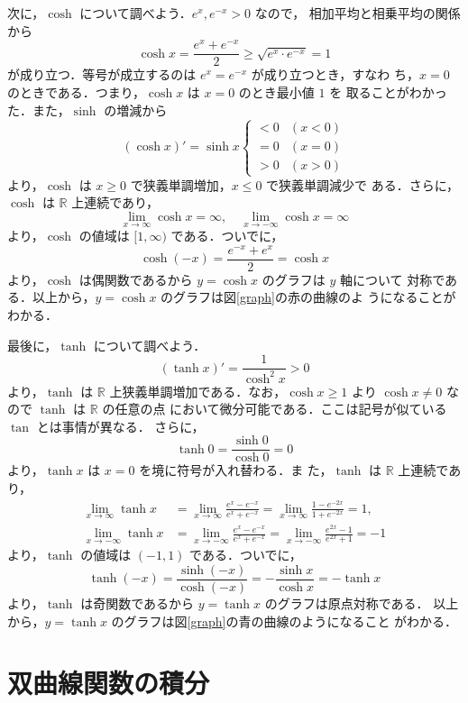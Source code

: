 \documentclass[dvipdfmx,12pt, uplatex]{jsarticle}
\begin{document}
次に，$\cosh$ について調べよう．$e^{x}, e^{-x}>0$ なので，
相加平均と相乗平均の関係から
\[
  \cosh x = \frac{e^{x} + e^{-x}}{2} \geq \sqrt{ e^{x} \cdot e^{-x}} = 1
\]
が成り立つ．等号が成立するのは $e^{x}=e^{-x}$ が成り立つとき，すなわ
ち，$x=0$ のときである．つまり，$\cosh x$ は $x=0$ のとき最小値 $1$ を
取ることがわかった．また，$\sinh$ の増減から
\[
  \left( \cosh x \right)' = \sinh x 
  \begin{cases}
    <0 & (x<0)\\
    =0 & (x=0)\\
    >0 & (x>0)
  \end{cases}
\]
より，$\cosh$ は $x \geq 0$ で狭義単調増加，$x \leq 0$ で狭義単調減少で
ある．さらに，$\cosh$ は $\mathbb{R}$ 上連続であり，
\[
\lim_{x \to \infty} \cosh x = \infty, \quad \lim_{x \to -\infty} \cosh x = \infty
\]
より，$\cosh$ の値域は $[1, \infty)$ である．ついでに，
\[
  \cosh (-x) = \frac{e^{-x} + e^{x}}{2} = \cosh x
\]
より，$\cosh$ は偶関数であるから $y=\cosh x$ のグラフは $y$ 軸について
対称である．以上から，$y=\cosh x$ のグラフは図\ref{graph}の赤の曲線のよ
うになることがわかる．

最後に，$\tanh$ について調べよう．
\[
  \left( \tanh x\right)' = \frac{1}{\cosh^2 x} >0
\]
より，$\tanh$ は $\mathbb{R}$ 上狭義単調増加である．なお，$\cosh x
\geq 1$ より $\cosh x \neq 0$ なので $\tanh$ は $\mathbb{R}$ の任意の点
において微分可能である．ここは記号が似ている $\tan$ とは事情が異なる．
さらに，
\[
  \tanh 0 = \frac{\sinh 0}{\cosh 0} = 0
\]
より，$\tanh x$ は $x=0$ を境に符号が入れ替わる．ま
た，$\tanh$ は $\mathbb{R}$ 上連続であり，
\begin{align*}
  \lim_{x \to \infty} \tanh x &= \lim_{x \to \infty} \frac{e^{x} - e^{-x}}{e^{x} + e^{-x}}
    = \lim_{x \to \infty} \frac{1 - e^{-2x}}{1 + e^{-2x}} = 1,\\
  \lim_{x \to -\infty} \tanh x &= \lim_{x \to -\infty} \frac{e^{x} -e^{-x}}{e^{x} + e^{-x}}
    =\lim_{x \to -\infty} \frac{e^{2x} -1}{e^{2x} +1} = -1
\end{align*}
より，$\tanh$ の値域は $(-1,1)$ である．ついでに，
\[
  \tanh (-x) = \frac{\sinh (-x)}{\cosh (-x)} = -\frac{\sinh x}{\cosh x} = -\tanh x
\]
より，$\tanh$ は奇関数であるから $y=\tanh x$ のグラフは原点対称である．
以上から，$y=\tanh x$ のグラフは図\ref{graph}の青の曲線のようになること
がわかる．


\section{双曲線関数の積分}
\end{document}

